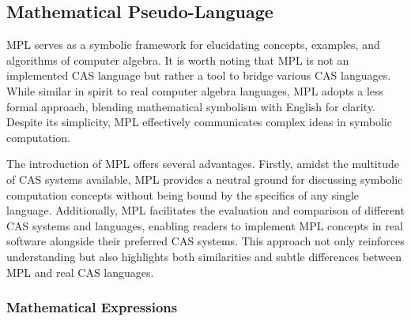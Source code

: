 \subsection{Mathematical Pseudo-Language}

\ac{MPL} serves as a symbolic framework for elucidating concepts, examples, and algorithms of computer algebra. It is worth noting that \ac{MPL} is not an implemented \ac{CAS} language but rather a tool to bridge various \ac{CAS} languages. While similar in spirit to real computer algebra languages, \ac{MPL} adopts a less formal approach, blending mathematical symbolism with English for clarity. Despite its simplicity, \ac{MPL} effectively communicates complex ideas in symbolic computation.

The introduction of \ac{MPL} offers several advantages. Firstly, amidst the multitude of \ac{CAS} systems available, \ac{MPL} provides a neutral ground for discussing symbolic computation concepts without being bound by the specifics of any single language. Additionally, \ac{MPL} facilitates the evaluation and comparison of different \ac{CAS} systems and languages, enabling readers to implement \ac{MPL} concepts in real software alongside their preferred \ac{CAS} systems. This approach not only reinforces understanding but also highlights both similarities and subtle differences between \ac{MPL} and real \ac{CAS} languages.

\subsubsection{Mathematical Expressions}


